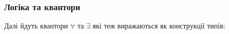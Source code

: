 \documentclass[11pt,oneside]{article}
\begin{document}
\begin{prooftree}
\end{prooftree}


\newpage

  \subsubsection*{Логіка та квантори}

Далі йдуть квантори $\forall$ та $\exists$ які теж виражаються як конструкції типів:

\begingroup
\parbox[t][][l]{0.40\textwidth}{

\begin{prooftree}
\end{prooftree}

\begin{prooftree}
\end{prooftree}

}
\hspace{0.1cm}
\parbox[t][][r]{0.60\textwidth}{

\begin{prooftree}
\end{prooftree}


\begin{prooftree}
\end{prooftree}

}
\endgroup

\begingroup
\parbox[t][][l]{0.40\textwidth}{

\begin{prooftree}
\end{prooftree}

}
\hspace{0.1cm}
\parbox[t][][r]{0.60\textwidth}{

}\endgroup
\end{document}
